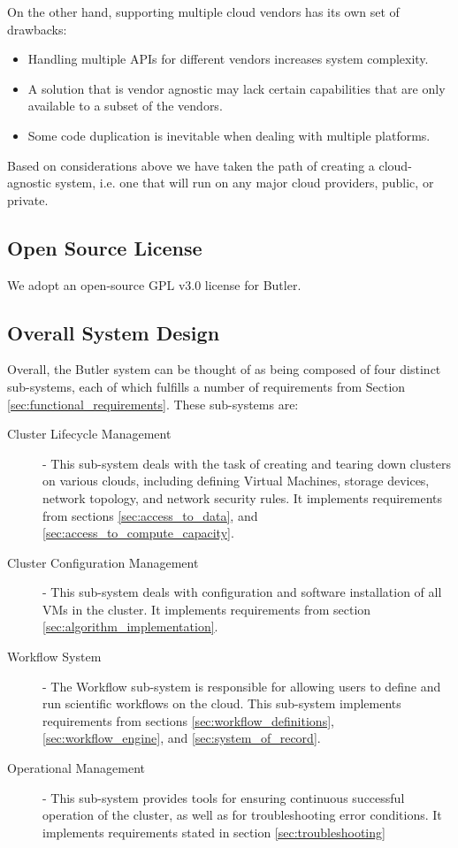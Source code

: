 On the other hand, supporting multiple cloud vendors has its own set of drawbacks:

\begin{itemize}
\item Handling multiple APIs for different vendors increases system complexity.
\item A solution that is vendor agnostic may lack certain capabilities that are only available to a subset of the vendors.
\item Some code duplication is inevitable when dealing with multiple platforms.
\end{itemize}

Based on considerations above we have taken the path of creating a cloud-agnostic system, i.e. one that will run on any major cloud providers, public, or private.

\subsection {Open Source License}

We adopt an open-source GPL v3.0 license for Butler.

\subsection {Overall System Design}

Overall, the Butler system can be thought of as being composed of four distinct sub-systems, each of which fulfills a number of requirements from Section \ref{sec:functional_requirements}. These sub-systems are:

\begin{description}
\item [Cluster Lifecycle Management] - This sub-system deals with the task of creating and tearing down clusters on various clouds, including defining Virtual Machines, storage devices, network topology, and network security rules. It implements requirements from sections \ref{sec:access_to_data}, and \ref{sec:access_to_compute_capacity}.
\item [Cluster Configuration Management] - This sub-system deals with configuration and software installation of all VMs in the cluster. It implements requirements from section \ref{sec:algorithm_implementation}.
\item [Workflow System] - The Workflow sub-system is responsible for allowing users to define and run scientific workflows on the cloud. This sub-system implements requirements from sections \ref{sec:workflow_definitions}, \ref{sec:workflow_engine}, and \ref{sec:system_of_record}.
\item [Operational Management] - This sub-system provides tools for ensuring continuous successful operation of the cluster, as well as for troubleshooting error conditions. It implements requirements stated in section \ref{sec:troubleshooting}
\end{description}

